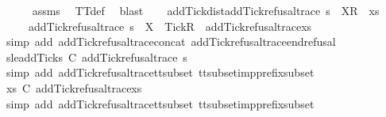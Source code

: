 \ \ \ \ \isamarkupfalse%
\ assms\ \isamarkupfalse%
\ TT{}{\isacharunderscore}def\ \isamarkupfalse%
\ blast\isanewline
\isanewline
\ \ \isamarkupfalse%
\ add{\isacharunderscore}Tick{\isacharunderscore}dist{\isacharcolon}{\isachardoublequoteopen}add{\isacharunderscore}Tick{\isacharunderscore}refusal{\isacharunderscore}trace\ {\isacharparenleft}s\ {\isacharat}\ {\isacharbrackleft}{\isacharbrackleft}X{\isacharbrackright}\isactrlsub R{\isacharbrackright}\ {\isacharat}\ xs{\isacharparenright}\ {\isacharequal}\isanewline
\ \ \ \ \ add{\isacharunderscore}Tick{\isacharunderscore}refusal{\isacharunderscore}trace\ s\ {\isacharat}\ {\isacharbrackleft}{\isacharbrackleft}X\ {\isasymunion}\ {\isacharbraceleft}Tick{\isacharbraceright}{\isacharbrackright}\isactrlsub R{\isacharbrackright}\ {\isacharat}\ add{\isacharunderscore}Tick{\isacharunderscore}refusal{\isacharunderscore}trace{\isacharparenleft}xs{\isacharparenright}{\isachardoublequoteclose}\isanewline
\ \ \ \ \isamarkupfalse%
\ {\isacharparenleft}simp\ add{\isacharcolon}\ add{\isacharunderscore}Tick{\isacharunderscore}refusal{\isacharunderscore}trace{\isacharunderscore}concat\ add{\isacharunderscore}Tick{\isacharunderscore}refusal{\isacharunderscore}trace{\isacharunderscore}end{\isacharunderscore}refusal{\isacharparenright}\isanewline
\ \ \isanewline
\ \ \isamarkupfalse%
\ s{\isacharunderscore}le{\isacharunderscore}addTick{\isacharcolon}{\isachardoublequoteopen}s\ {\isasymlesssim}\isactrlsub C\ add{\isacharunderscore}Tick{\isacharunderscore}refusal{\isacharunderscore}trace\ s{\isachardoublequoteclose}\isanewline
\ \ \ \ \isamarkupfalse%
\ {\isacharparenleft}simp\ add{\isacharcolon}\ add{\isacharunderscore}Tick{\isacharunderscore}refusal{\isacharunderscore}trace{\isacharunderscore}tt{\isacharunderscore}subset\ tt{\isacharunderscore}subset{\isacharunderscore}imp{\isacharunderscore}prefix{\isacharunderscore}subset{\isacharparenright}\isanewline
\ \ \isamarkupfalse%
\ {\isachardoublequoteopen}xs\ {\isasymlesssim}\isactrlsub C\ add{\isacharunderscore}Tick{\isacharunderscore}refusal{\isacharunderscore}trace{\isacharparenleft}xs{\isacharparenright}{\isachardoublequoteclose}\isanewline
\ \ \ \ \isamarkupfalse%
\ {\isacharparenleft}simp\ add{\isacharcolon}\ add{\isacharunderscore}Tick{\isacharunderscore}refusal{\isacharunderscore}trace{\isacharunderscore}tt{\isacharunderscore}subset\ tt{\isacharunderscore}subset{\isacharunderscore}imp{\isacharunderscore}prefix{\isacharunderscore}subset{\isacharparenright}\isanewline
